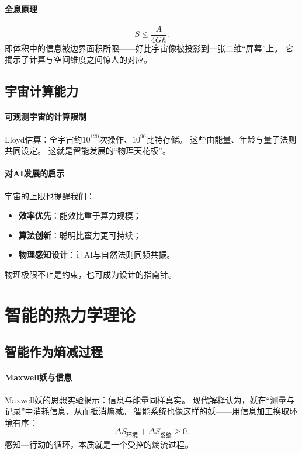 \paragraph{全息原理}
$$S\le\dfrac{A}{4G\hbar}.$$
即体积中的信息被边界面积所限——\;好比宇宙像被投影到一张二维“屏幕”上。  
它揭示了计算与空间维度之间惊人的对应。

\subsection{宇宙计算能力}

\paragraph{可观测宇宙的计算限制}
Lloyd估算：全宇宙约$10^{120}$次操作、$10^{90}$比特存储。  
这些由能量、年龄与量子法则共同设定。  
这就是智能发展的“物理天花板”。

\paragraph{对AI发展的启示}
宇宙的上限也提醒我们：
\begin{itemize}
\item \textbf{效率优先}：能效比重于算力规模；
\item \textbf{算法创新}：聪明比蛮力更可持续；
\item \textbf{物理感知设计}：让AI与自然法则同频共振。
\end{itemize}
物理极限不止是约束，也可成为设计的指南针。



\section{智能的热力学理论}

\subsection{智能作为熵减过程}

\paragraph{Maxwell妖与信息}
Maxwell妖的思想实验揭示：\;信息与能量同样真实。  
现代解释认为，妖在“测量与记录”中消耗信息，从而抵消熵减。  
智能系统也像这样的妖——\;用信息加工换取环境有序：
$$\Delta S_{\text{环境}}+\Delta S_{\text{系统}}\ge0.$$
感知—行动的循环，本质就是一个受控的熵流过程。

